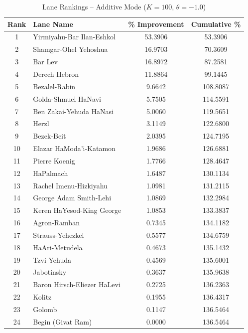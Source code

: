 \begin{table}[H]
\centering
\caption{Lane Rankings -- Additive Mode ($K=100$, $\theta=-1.0$)}
\label{tab:lane_rankings}
\begin{tabular}{@{}clcc@{}}
\toprule
\textbf{Rank} & \textbf{Lane Name} & \textbf{\% Improvement} & \textbf{Cumulative \%} \\
\midrule
1 & Yirmiyahu-Bar Ilan-Eshkol & 53.3906 & 53.3906 \\
2 & Shamgar-Ohel Yehoshua & 16.9703 & 70.3609 \\
3 & Bar Lev & 16.8972 & 87.2581 \\
4 & Derech Hebron & 11.8864 & 99.1445 \\
5 & Bezalel-Rabin & 9.6642 & 108.8087 \\
6 & Golda-Shmuel HaNavi & 5.7505 & 114.5591 \\
7 & Ben Zakai-Yehuda HaNasi & 5.0060 & 119.5651 \\
8 & Herzl & 3.1149 & 122.6800 \\
9 & Bezek-Beit & 2.0395 & 124.7195 \\
10 & Elazar HaModa'i-Katamon & 1.9686 & 126.6881 \\
11 & Pierre Koenig & 1.7766 & 128.4647 \\
12 & HaPalmach & 1.6487 & 130.1134 \\
13 & Rachel Imenu-Hizkiyahu & 1.0981 & 131.2115 \\
14 & George Adam Smith-Lehi & 1.0869 & 132.2984 \\
15 & Keren HaYesod-King George & 1.0853 & 133.3837 \\
16 & Agron-Ramban & 0.7345 & 134.1182 \\
17 & Strauss-Yehezkel & 0.5577 & 134.6759 \\
18 & HaAri-Metudela & 0.4673 & 135.1432 \\
19 & Tzvi Yehuda & 0.4569 & 135.6001 \\
20 & Jabotinsky & 0.3637 & 135.9638 \\
21 & Baron Hirsch-Eliezer HaLevi & 0.2725 & 136.2363 \\
22 & Kolitz & 0.1955 & 136.4317 \\
23 & Golomb & 0.1147 & 136.5464 \\
24 & Begin (Givat Ram) & 0.0000 & 136.5464 \\
\bottomrule
\end{tabular}
\end{table}
